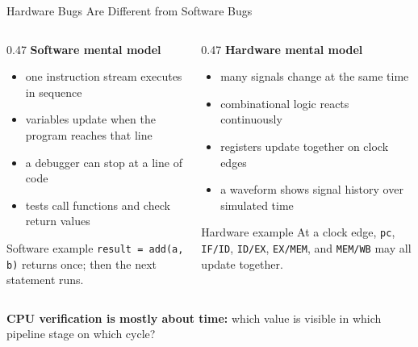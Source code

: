 \documentclass[aspectratio=169,10pt]{beamer}
\begin{document}
\begin{frame}{Hardware Bugs Are Different from Software Bugs}
  \begin{columns}[T]
    \begin{column}{0.47\textwidth}
      \textbf{Software mental model}
      \begin{itemize}
        \item one instruction stream executes in sequence
        \item variables update when the program reaches that line
        \item a debugger can stop at a line of code
        \item tests call functions and check return values
      \end{itemize}

      \vspace{0.7em}
      \begin{block}{Software example}
        \texttt{result = add(a, b)} returns once; then the next statement runs.
      \end{block}
    \end{column}
    \begin{column}{0.47\textwidth}
      \textbf{Hardware mental model}
      \begin{itemize}
        \item many signals change at the same time
        \item combinational logic reacts continuously
        \item registers update together on clock edges
        \item a waveform shows signal history over simulated time
      \end{itemize}

      \vspace{0.7em}
      \begin{block}{Hardware example}
        At a clock edge, \texttt{pc}, \texttt{IF/ID}, \texttt{ID/EX}, \texttt{EX/MEM}, and \texttt{MEM/WB} may all update together.
      \end{block}
    \end{column}
  \end{columns}

  \vspace{0.8em}
  \begin{center}
    \small\textbf{CPU verification is mostly about time:} which value is visible in which pipeline stage on which cycle?
  \end{center}
\end{frame}
\end{document}
